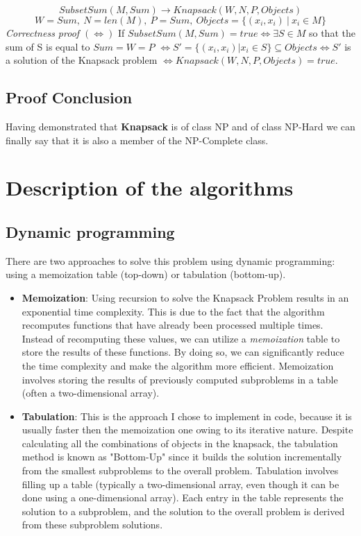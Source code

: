 \documentclass{llncs}
\begin{document}
\[SubsetSum(M, Sum) \rightarrow Knapsack(W, N, P, Objects)\]
\[W = Sum, \ N = len(M), \ P = Sum, \ Objects = \{(x_i,x_i)\ |\ x_i \in M \} \]
\textit{Correctness proof $(\Leftrightarrow)$} If $SubsetSum(M, Sum) = true \Leftrightarrow \exists S\in M$ so that the sum of S is equal to $Sum = W = P$ $\Leftrightarrow S' = \{(x_i, x_i) | x_i \in S\} \subseteq Objects \Leftrightarrow S'$ is a solution of the Knapsack problem $\Leftrightarrow Knapsack(W, N, P, Objects) = true$.


\subsection{Proof Conclusion}
Having demonstrated that \textbf{Knapsack} is of class NP and of class NP-Hard we can finally say that it is also a member of the NP-Complete class.


\section{Description of the algorithms}
\subsection{Dynamic programming}
There are two approaches to solve this problem using dynamic programming:
using a memoization table (top-down) or tabulation (bottom-up). 
\begin{itemize}
    \item \textbf{Memoization}: Using recursion to solve the Knapsack Problem results in an exponential
        time complexity. This is due to the fact that the algorithm recomputes functions that have already
        been processed multiple times. Instead of recomputing these values, we can utilize a \textit{memoization}
        table to store the results of these functions. By doing so, we can significantly reduce the time complexity and make the algorithm more efficient. Memoization involves storing the results of previously computed subproblems in a table (often a two-dimensional array).
    \item \textbf{Tabulation}: This is the approach I chose to implement in code, because it is usually
        faster then the memoization one owing to its iterative nature. Despite calculating all the
        combinations of objects in the knapsack, the tabulation method is known as "Bottom-Up" since
        it builds the solution incrementally from the smallest subproblems to the overall problem.
        Tabulation involves filling up a table (typically a two-dimensional array, even though it can be
        done using a one-dimensional array). Each entry in the table represents the solution to a subproblem,
        and the solution to the overall problem is derived from these subproblem solutions.
\end{itemize}
\end{document}
